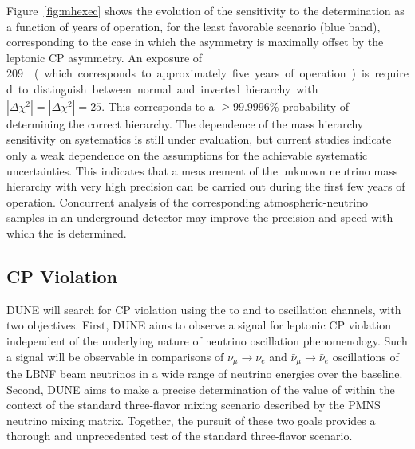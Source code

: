 Figure~\ref{fig:mhexec} shows the evolution of the sensitivity to the  determination as a function
of years of operation, for the least favorable scenario (blue band), corresponding to the case in which the  asymmetry is
maximally offset by the leptonic CP asymmetry. An exposure of \SI{209}~\ktMWyr{}  
(which corresponds to approximately five years of operation) is required to distinguish
between normal and inverted hierarchy with $|\Delta \chi^2| =
\overline{|\Delta \chi^2|} = 25$.  This corresponds to a $\geq
99.9996\%$ probability of determining the correct hierarchy. 
The dependence of the mass
hierarchy sensitivity on systematics is still under evaluation, but
current studies indicate only a weak dependence on the assumptions for 
the achievable systematic uncertainties. This indicates that a measurement of the unknown
neutrino mass hierarchy with very high precision can be carried out
during the first few years of operation.
Concurrent analysis of the corresponding atmospheric-neutrino
samples in an underground detector may improve the precision and
speed with which the  is determined.

\subsection{CP Violation}

DUNE will search for CP violation using the \numu to \nue and \anumu
to \anue oscillation channels, with two objectives.  First, DUNE aims
to observe a signal for leptonic CP violation independent of the
underlying nature of neutrino oscillation phenomenology. Such a signal
will be observable in comparisons of $\nu_\mu \rightarrow \nu_e$ and
$\bar{\nu}_{\mu} \rightarrow \bar{\nu}_e$ oscillations of the LBNF
beam neutrinos in a wide range of neutrino energies over the
 baseline.
Second,
DUNE aims to make a precise determination of the value of \deltacp
within the context of the standard three-flavor mixing scenario
described by the PMNS neutrino mixing matrix. Together, the pursuit of
these two goals provides a thorough and unprecedented test of the standard three-flavor
scenario.

